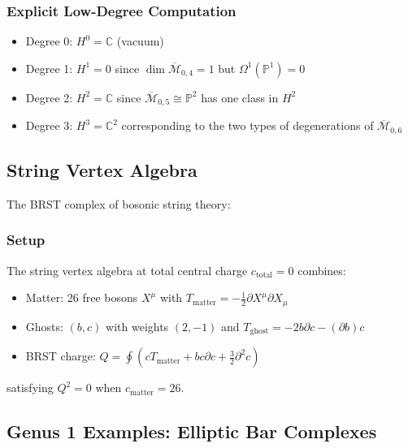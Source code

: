 \subsubsection{Explicit Low-Degree Computation}
 
\begin{example}
\begin{itemize}
\item Degree 0: $H^0 = \mathbb{C}$ (vacuum)
\item Degree 1: $H^1 = 0$ since $\dim \overline{\mathcal{M}}_{0,4} = 1$ but $\Omega^1(\mathbb{P}^1) = 0$
\item Degree 2: $H^2 = \mathbb{C}$ since $\overline{\mathcal{M}}_{0,5} \cong \mathbb{P}^2$ has one class in $H^2$
\item Degree 3: $H^3 = \mathbb{C}^2$ corresponding to the two types of degenerations of 
$\overline{\mathcal{M}}_{0,6}$
\end{itemize}
\end{example}
 
\subsection{String Vertex Algebra}
 
The BRST complex of bosonic string theory:
 
\subsubsection{Setup}
 
\begin{definition}
The string vertex algebra at total central charge $c_{\text{total}} = 0$ combines:
\begin{itemize}
\item Matter: 26 free bosons $X^\mu$ with $T_{\text{matter}} = -\frac{1}{2}\partial X^\mu \partial X_\mu$
\item Ghosts: $(b,c)$ with weights $(2,-1)$ and $T_{\text{ghost}} = -2b\partial c - (\partial b)c$
\item BRST charge: $Q = \oint \left(c T_{\text{matter}} + bc\partial c + \frac{3}{2}\partial^2 c\right)$
\end{itemize}
satisfying $Q^2 = 0$ when $c_{\text{matter}} = 26$.
\end{definition}

\subsection{Genus 1 Examples: Elliptic Bar Complexes}

